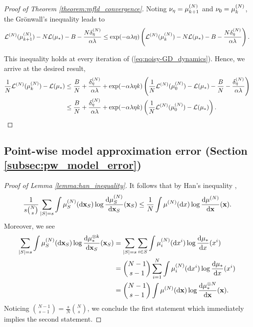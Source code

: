 \begin{proof}[Proof of Theorem \ref{theorem:mfld_convergence}]
    Noting $\nu_\eta = \pow[\mu,N]_{k+1}$ and $\nu_0 = \pow[\mu,N]_k$, the Gr\"{o}nwall’s inequality leads to 
    \[ 
        \pow[\cL,N](\pow[\mu,N]_{k+1}) -  N\cL(\mu_*) - B - \frac{ N\pow[\delta,N]_{\eta}}{\alpha \lambda} 
        \leq \exp( -\alpha\lambda\eta )\left(  \pow[\cL,N](\pow[\mu,N]_k) -  N\cL(\mu_*) - B- \frac{N\pow[\delta,N]_{\eta}}{\alpha \lambda} \right). 
    \]
    
This inequality holds at every iteration of (\ref{eq:noisy-GD_dynamics}). Hence, we arrive at the desired result,  
\begin{align*}
    \frac{1}{N}\pow[\cL,N](\pow[\mu,N]_k) - \cL(\mu_*)  
    &\leq \frac{B}{N} + \frac{ \pow[\delta,N]_{\eta}}{\alpha \lambda} 
    + \exp( -\alpha\lambda\eta k )\left( \frac{1}{N}\pow[\cL,N](\pow[\mu,N]_0) - \cL(\mu_*) - \frac{B}{N} - \frac{ \pow[\delta,N]_{\eta}}{\alpha \lambda} \right) \\
    &\leq \frac{B}{N} + \frac{ \pow[\delta,N]_{\eta}}{\alpha \lambda} 
    + \exp( -\alpha\lambda\eta k )\left( \frac{1}{N}\pow[\cL,N](\pow[\mu,N]_0) - \cL(\mu_*) \right).
\end{align*}
\end{proof}

\subsection{Point-wise model approximation error (Section \ref{subsec:pw_model_error})}\label{subsec:pw_model_error_proof}
\begin{proof}[Proof of Lemma \ref{lemma:han_inequality}]
    It follows that by Han's inequality \citep{dembo1991information},
    \[ \frac{1}{s \binom{N}{s}} \sum_{|S|=s} \int \pow[\mu,N]_S(\rd \vx_S) \log \frac{\rd \pow[\mu,N]_S}{\rd \vx_S}(\vx_S) \leq \frac{1}{N}\int \pow[\mu,N](\rd x) \log \frac{\rd \pow[\mu,N]}{\rd \vx}(\vx). \]
    Moreover, we see
    \begin{align*} 
        \sum_{|S|=s} \int \pow[\mu,N]_S(\rd \vx_S) \log \frac{\rd \tensor[\mu_*,k]}{\rd \vx_S}(\vx_S)
        &= \sum_{|S|=s} \sum_{i \in S}\int \pow[\mu,N]_i(\rd x^i) \log \frac{\rd \mu_*}{\rd x}(x^i)  \\
        &= \binom{N-1}{s-1}\sum_{i=1}^N\int \pow[\mu,N]_i(\rd x^i) \log \frac{\rd \mu_*}{\rd x}(x^i) \\
        &= \binom{N-1}{s-1} \int \pow[\mu,N](\rd \vx) \log \frac{\rd \tensor[\mu_*,N]}{\rd \vx}(\vx). 
    \end{align*}
    Noticing $\binom{N-1}{s-1} = \frac{s}{N}\binom{N}{s}$, we conclude the first statement which immediately implies the second statement.
\end{proof}


